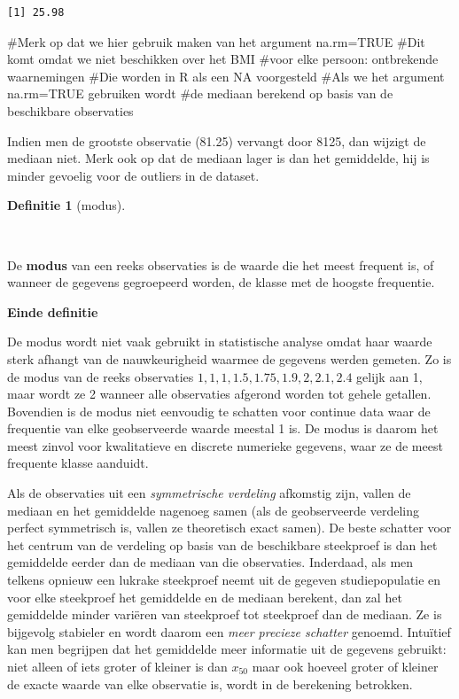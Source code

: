 \documentclass[
  dutch,
  letterpaper,
  12pt]{book}
\newenvironment{Shaded}{\begin{snugshade}}{\end{snugshade}}
\newcommand{\CommentTok}[1]{\textcolor[rgb]{0.37,0.37,0.37}{#1}}
\theoremstyle{definition}
\theoremstyle{definition}
\newtheorem{definition}{Definitie}[chapter]
\theoremstyle{definition}
\theoremstyle{remark}
\begin{document}
\begin{verbatim}
[1] 25.98
\end{verbatim}

\begin{Shaded}
\begin{Highlighting}[]
\CommentTok{\#Merk op dat we hier gebruik maken van het argument na.rm=TRUE}
\CommentTok{\#Dit komt omdat we niet beschikken over het BMI}
\CommentTok{\#voor elke persoon: ontbrekende waarnemingen}
\CommentTok{\#Die worden in R als een NA voorgesteld}
\CommentTok{\#Als we het argument na.rm=TRUE gebruiken wordt}
\CommentTok{\#de mediaan berekend op basis van de beschikbare observaties}
\end{Highlighting}
\end{Shaded}

Indien men de grootste observatie (81.25) vervangt door 8125, dan
wijzigt de mediaan niet. Merk ook op dat de mediaan lager is dan het
gemiddelde, hij is minder gevoelig voor de outliers in de dataset.

\begin{definition}[modus]\protect\hypertarget{def-modus}{}\label{def-modus}

~

\end{definition}

De \textbf{modus} van een reeks observaties is de waarde die het meest
frequent is, of wanneer de gegevens gegroepeerd worden, de klasse met de
hoogste frequentie.

\textbf{Einde definitie}

De modus wordt niet vaak gebruikt in statistische analyse omdat haar
waarde sterk afhangt van de nauwkeurigheid waarmee de gegevens werden
gemeten. Zo is de modus van de reeks observaties
\(1, 1, 1, 1.5, 1.75, 1.9, 2, 2.1, 2.4\) gelijk aan 1, maar wordt ze 2
wanneer alle observaties afgerond worden tot gehele getallen. Bovendien
is de modus niet eenvoudig te schatten voor continue data waar de
frequentie van elke geobserveerde waarde meestal 1 is. De modus is
daarom het meest zinvol voor kwalitatieve en discrete numerieke
gegevens, waar ze de meest frequente klasse aanduidt.

Als de observaties uit een \emph{symmetrische verdeling} afkomstig zijn,
vallen de mediaan en het gemiddelde nagenoeg samen (als de geobserveerde
verdeling perfect symmetrisch is, vallen ze theoretisch exact samen). De
beste schatter voor het centrum van de verdeling op basis van de
beschikbare steekproef is dan het gemiddelde eerder dan de mediaan van
die observaties. Inderdaad, als men telkens opnieuw een lukrake
steekproef neemt uit de gegeven studiepopulatie en voor elke steekproef
het gemiddelde en de mediaan berekent, dan zal het gemiddelde minder
variëren van steekproef tot steekproef dan de mediaan. Ze is bijgevolg
stabieler en wordt daarom een \emph{meer precieze schatter} genoemd.
Intuïtief kan men begrijpen dat het gemiddelde meer informatie uit de
gegevens gebruikt: niet alleen of iets groter of kleiner is dan
\(x_{50}\) maar ook hoeveel groter of kleiner de exacte waarde van elke
observatie is, wordt in de berekening betrokken.
\end{document}
